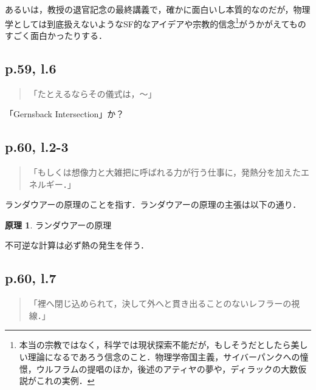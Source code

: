 \documentclass[10pt, a5paper, twoside]{jsarticle}
\theoremstyle{definition}
\newtheorem{prn}{原理}
\begin{document}
                あるいは，教授の退官記念の最終講義で，確かに面白いし本質的なのだが，物理学としては到底扱えないようなSF的なアイデアや宗教的信念\footnote{本当の宗教ではなく，科学では現状探索不能だが，もしそうだとしたら美しい理論になるであろう信念のこと．物理学帝国主義，サイバーパンクへの憧憬，ウルフラムの提唱のほか，後述のアティヤの夢や，ディラックの大数仮説がこれの実例．}がうかがえてものすごく面白かったりする．

            \subsection{p.59, l.6}

                \begin{quote}

                    「たとえるならその儀式は，〜」

                \end{quote}

                「Gernsback Intersection」か？

            \subsection{p.60, l.2-3}

                \begin{quote}

                    「もしくは想像力と大雑把に呼ばれる力が行う仕事に，発熱分を加えたエネルギー．」

                \end{quote}

                ランダウアーの原理のことを指す．ランダウアーの原理の主張は以下の通り．

                \begin{prn}

                    ランダウアーの原理

                    不可逆な計算は必ず熱の発生を伴う．

                \end{prn}

            \subsection{p.60, l.7}

                \begin{quote}

                    「裡へ閉じ込められて，決して外へと貫き出ることのないレフラーの視線．」

                \end{quote}
\end{document}
